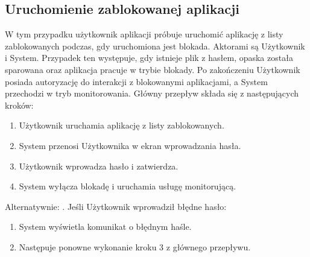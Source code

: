 \subsection{Uruchomienie zablokowanej aplikacji}
W tym przypadku użytkownik aplikacji próbuje uruchomić aplikację z listy zablokowanych podczas, gdy uruchomiona jest blokada. Aktorami są Użytkownik i System. Przypadek ten występuje, gdy istnieje plik z hasłem, opaska została sparowana oraz aplikacja pracuje w trybie blokady. Po zakończeniu Użytkownik posiada autoryzację do interakcji z blokowanymi aplikacjami, a System przechodzi w tryb monitorowania. Główny przepływ składa się z następujących kroków:
\begin{enumerate}
    \item Użytkownik uruchamia aplikację z listy zablokowanych.
    \item System przenosi Użytkownika w ekran wprowadzania hasła.
    \item Użytkownik wprowadza hasło i zatwierdza.
    \item System wyłącza blokadę i uruchamia usługę monitorującą.
\end{enumerate}
Alternatywnie:
\newline\newline
{}. Jeśli Użytkownik wprowadził błędne hasło:
\begin{enumerate}[leftmargin=3\parindent]
    \item System wyświetla komunikat o błędnym haśle.
    \item Następuje ponowne wykonanie kroku 3 z głównego przepływu.
\end{enumerate}

